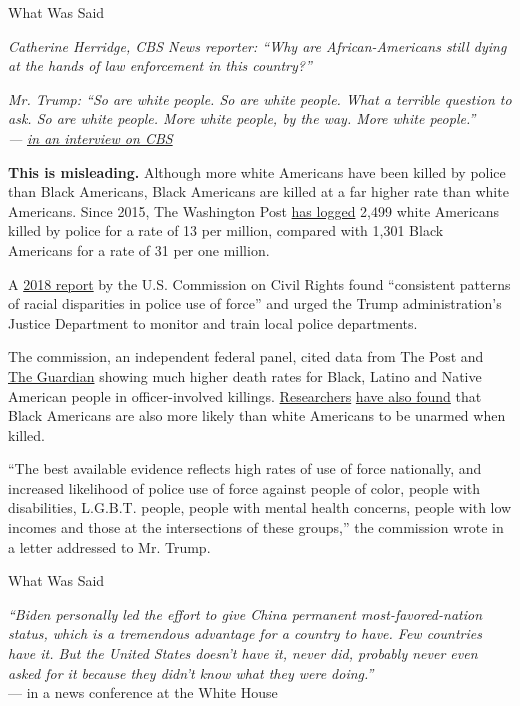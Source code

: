 What Was Said

\emph{Catherine Herridge, CBS News reporter: ``Why are African-Americans
still dying at the hands of law enforcement in this country?''}

\emph{Mr. Trump: ``So are white people. So are white people. What a
terrible question to ask. So are white people. More white people, by the
way. More white people.''}\\
\emph{---} \href{https://www.youtube.com/watch?v=pyJUmK3fUTs}{\emph{in
an interview on CBS}}

\textbf{This is misleading.} Although more white Americans have been
killed by police than Black Americans, Black Americans are killed at a
far higher rate than white Americans. Since 2015, The Washington Post
\href{https://www.washingtonpost.com/graphics/investigations/police-shootings-database/}{has
logged} 2,499 white Americans killed by police for a rate of 13 per
million, compared with 1,301 Black Americans for a rate of 31 per one
million.

A \href{https://www.usccr.gov/pubs/2018/11-15-Police-Force.pdf}{2018
report} by the U.S. Commission on Civil Rights found ``consistent
patterns of racial disparities in police use of force'' and urged the
Trump administration's Justice Department to monitor and train local
police departments.

The commission, an independent federal panel, cited data from The Post
and
\href{https://www.theguardian.com/us-news/series/counted-us-police-killings}{The
Guardian} showing much higher death rates for Black, Latino and Native
American people in officer-involved killings.
\href{https://policeviolencereport.org/}{Researchers}
\href{https://journals.plos.org/plosone/article?id=10.1371/journal.pone.0141854}{have
also found} that Black Americans are also more likely than white
Americans to be unarmed when killed.

``The best available evidence reflects high rates of use of force
nationally, and increased likelihood of police use of force against
people of color, people with disabilities, L.G.B.T. people, people with
mental health concerns, people with low incomes and those at the
intersections of these groups,'' the commission wrote in a letter
addressed to Mr. Trump.

What Was Said

\emph{``Biden personally led the effort to give China permanent
most-favored-nation status, which is a tremendous advantage for a
country to have. Few countries have it. But the United States doesn't
have it, never did, probably never even asked for it because they didn't
know what they were doing.''}\\
--- in a news conference at the White House

